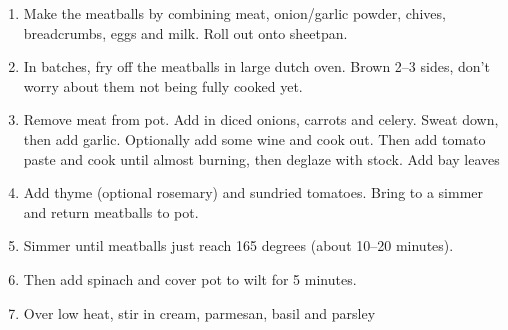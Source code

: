 \documentclass[]{report}
\begin{document}
            {\begin{enumerate}    %
                  \item  Make the meatballs by combining meat, onion/garlic powder, chives, breadcrumbs, eggs and milk. Roll out onto sheetpan. 
                  \item In batches, fry off the meatballs in large dutch oven. Brown 2--3 sides, don't worry about them not being fully cooked yet. 
                  \item Remove meat from pot. Add in diced onions, carrots and celery. Sweat down, then add garlic. Optionally add some wine and cook out. Then add tomato paste and cook until almost burning, then deglaze with stock. Add bay leaves 
                  \item Add thyme (optional rosemary) and sundried tomatoes. Bring to a simmer and return meatballs to pot. 
                  \item Simmer until meatballs just reach 165 degrees (about 10--20 minutes). 
                  \item Then add spinach and cover pot to wilt for 5 minutes. 
                  \item Over low heat, stir in cream, parmesan, basil and parsley
            \end{enumerate}}
\end{document}
